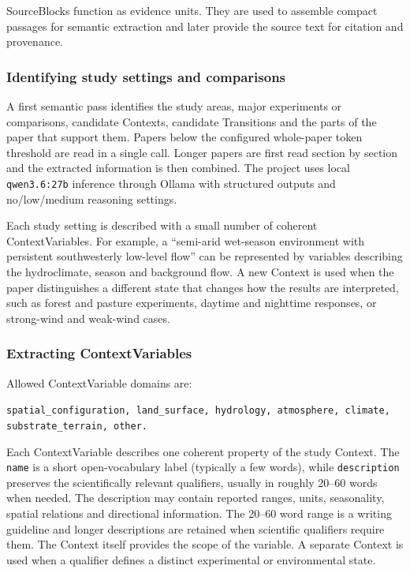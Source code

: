 \documentclass[10pt,twocolumn]{article}
\begin{document}
SourceBlocks function as evidence units. They are used to assemble compact passages for semantic extraction and later provide the source text for citation and provenance.

\subsubsection{Identifying study settings and comparisons}

A first semantic pass identifies the study areas, major experiments or comparisons, candidate Contexts, candidate Transitions and the parts of the paper that support them. Papers below the configured whole-paper token threshold are read in a single call. Longer papers are first read section by section and the extracted information is then combined. The project uses local \texttt{qwen3.6:27b} inference through Ollama with structured outputs and no/low/medium reasoning settings.

Each study setting is described with a small number of coherent ContextVariables. For example, a ``semi-arid wet-season environment with persistent southwesterly low-level flow'' can be represented by variables describing the hydroclimate, season and background flow. A new Context is used when the paper distinguishes a different state that changes how the results are interpreted, such as forest and pasture experiments, daytime and nighttime responses, or strong-wind and weak-wind cases.

\subsubsection{Extracting ContextVariables}

Allowed ContextVariable domains are:

\begin{center}
\small
\texttt{spatial\_configuration, land\_surface, hydrology, atmosphere, climate, substrate\_terrain, other.}
\end{center}

Each ContextVariable describes one coherent property of the study Context. The \texttt{name} is a short open-vocabulary label (typically a few words), while \texttt{description} preserves the scientifically relevant qualifiers, usually in roughly 20--60 words when needed. The description may contain reported ranges, units, seasonality, spatial relations and directional information. The 20--60 word range is a writing guideline and longer descriptions are retained when scientific qualifiers require them. The Context itself provides the scope of the variable. A separate Context is used when a qualifier defines a distinct experimental or environmental state.
\end{document}
